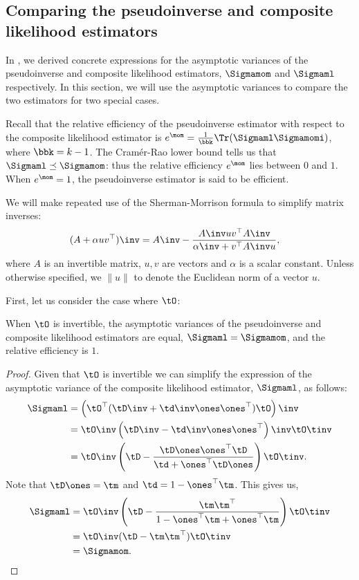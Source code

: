 \subsection{Comparing the pseudoinverse and composite likelihood estimators}
\label{app:rel-eff}

In , we derived concrete expressions for the
asymptotic variances of the pseudoinverse and composite likelihood
estimators, $\Sigmamom$ and $\Sigmaml$ respectively. 
In this section, we will use the asymptotic variances to compare the two
estimators for two special cases.

Recall that the relative efficiency of the pseudoinverse estimator with respect to the composite likelihood estimator is
$e^\mom
= \frac{1}{\bbk} \Tr(\Sigmaml \Sigmamomi)$, where $\bbk = k-1$. The
Cram\'{e}r-Rao lower bound tells us that $\Sigmaml \preceq \Sigmamom$:
thus the relative efficiency $e^\mom$ lies between $0$ and $1$. When
$e^\mom = 1$, the pseudoinverse estimator is said to be efficient.

We will make repeated use of the Sherman-Morrison formula to simplify
matrix inverses:
\begin{align*}
  (A + \alpha uv^\top)\inv &= A\inv - \frac{A\inv uv^\top A\inv}{\alpha\inv + v^\top A\inv u},
\end{align*}
where $A$ is an invertible matrix, $u, v$ are vectors and $\alpha$ is
a scalar constant. Unless otherwise specified, we $\|u\|$ to denote the
Euclidean norm of a vector $u$.

First, let us consider the case where $\tO$:
\begin{lemma}
  When $\tO$ is invertible, the asymptotic variances of the
  pseudoinverse and composite likelihood estimators are equal, $\Sigmaml
  = \Sigmamom$, and the relative efficiency is $1$.
\end{lemma}
\begin{proof}
  Given that $\tO$ is invertible we can simplify the expression of the
  asymptotic variance of the composite likelihood estimator, $\Sigmaml$,
  as follows:
\begin{align*}
    \Sigmaml 
      &= \left( \tO^\top(\tD\inv + \td\inv \ones \ones^\top) \tO \right)\inv \\
      &= \tO\inv \left( \tD\inv - \td\inv \ones \ones^\top \right)\inv \tO\tinv \\
      &= \tO\inv \left( \tD - \frac{\tD \ones \ones^\top \tD}{\td + \ones^\top \tD \ones} \right) \tO\tinv.
\end{align*}
Note that $\tD \ones = \tm$ and $\td = 1 - \ones^\top \tm$. This gives us,
\begin{align*}
    \Sigmaml 
      &= \tO\inv \left(\tD - \frac{\tm \tm^\top}{1 - \ones^\top \tm + \ones^\top \tm} \right) \tO\tinv \\
      &= \tO\inv (\tD - \tm \tm^\top) \tO\tinv \\
      &= \Sigmamom.
\end{align*}
\end{proof}

